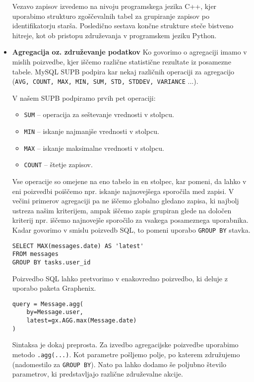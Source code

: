 \documentclass[a4paper,12pt,openright]{book}
\begin{document}
\begin{itemize}
        Vezavo zapisov izvedemo na nivoju programskega jezika C++, kjer uporabimo strukturo zgoščevalnih tabel za grupiranje zapisov po identifikatorju starša. Posledično sestava končne strukture steče bistveno hitreje, kot ob pristopu združevanja v programskem jeziku Python.

        \item \textbf{Agregacija oz. združevanje podatkov}
        \newline
        \noindent
        Ko govorimo o agregaciji imamo v mislih poizvedbe, kjer iščemo različne statistične rezultate iz posamezne tabele. MySQL SUPB podpira kar nekaj različnih operaciji za agregacijo \cite{MYSQL_AGG} ({\tt AVG, COUNT, MAX, MIN, SUM, STD, STDDEV, VARIANCE} ...).

        V našem SUPB podpiramo prvih pet operaciji:
        
        \begin{itemize}
            \item {\tt SUM} – operacija za seštevanje vrednosti v stolpcu.
            \item {\tt MIN} – iskanje najmanjše vrednosti v stolpcu.
            \item {\tt MAX} – iskanje maksimalne vrednosti v stolpcu.
            \item {\tt COUNT} – štetje zapisov.
        \end{itemize}

        Vse operacije so omejene na eno tabelo in en stolpec, kar pomeni, da lahko v eni poizvedbi poiščemo npr. iskanje najnovejšega sporočila med zapisi. V večini primerov agregaciji pa ne iščemo globalno gledano zapisa, ki najbolj ustreza našim kriterijem, ampak iščemo zapis grupiran glede na določen kriterij npr. iščemo najnovejše sporočilo za vsakega posameznega uporabnika. Kadar govorimo v smislu poizvedb SQL, to pomeni uporabo {\tt GROUP BY} stavka.

\begin{verbatim}
SELECT MAX(messages.date) AS 'latest' 
FROM messages
GROUP BY tasks.user_id
\end{verbatim}

        \noindent
        Poizvedbo SQL lahko pretvorimo v enakovredno poizvedbo, ki deluje z uporabo paketa Graphenix.

\begin{verbatim}
query = Message.agg(
    by=Message.user, 
    latest=gx.AGG.max(Message.date)
)
\end{verbatim}

        \noindent
        Sintaksa je dokaj preprosta. Za izvedbo agregacijske poizvedbe uporabimo metodo {\tt .agg(...)}. Kot parametre pošljemo polje, po katerem združujemo (nadomestilo za {\tt GROUP BY}). Nato pa lahko dodamo še poljubno število parametrov, ki predstavljajo različne združevalne akcije.
\end{itemize}
\end{document}
